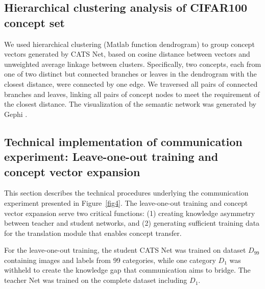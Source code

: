 \documentclass[pdflatex,sn-mathphys-num,lineno]{sn-jnl}%
\begin{document}
\begin{CJK}{UTF8}{gbsn}
\subsection{Hierarchical clustering analysis of CIFAR100 concept set}
We used hierarchical clustering  (Matlab function dendrogram) to group concept vectors generated by CATS Net, based on cosine distance between vectors and unweighted average linkage between clusters. Specifically, two concepts, each from one of two distinct but connected branches or leaves in the dendrogram with the closest distance, were connected by one edge. We traversed all pairs of connected branches and leaves, linking all pairs of concept nodes to meet the requirement of the closest distance. The visualization of the semantic network was generated by Gephi \cite{bastian_gephi_2009}.

\subsection{Technical implementation of communication experiment: Leave-one-out training and concept vector expansion}
This section describes the technical procedures underlying the communication experiment presented in Figure~\ref{fig4}. The leave-one-out training and concept vector expansion serve two critical functions: (1) creating knowledge asymmetry between teacher and student networks, and (2) generating sufficient training data for the translation module that enables concept transfer.

For the leave-one-out training, the student CATS Net was trained on dataset $D_{99}$ containing images and labels from 99 categories, while one category $D_1$ was withheld to create the knowledge gap that communication aims to bridge. The teacher Net was trained on the complete dataset including $D_1$. 


\end{CJK}
\end{document}
